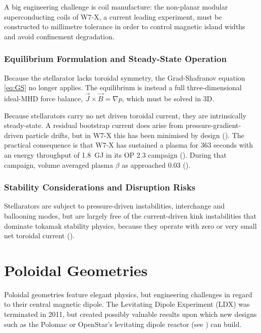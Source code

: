 A big engineering challenge is coil manufacture: the non-planar modular
superconducting coils of W7-X, a current leading experiment, must be constructed to millimetre tolerance in
order to control magnetic island widths and avoid confinement degradation.


\subsubsection{Equilibrium Formulation and Steady-State Operation}

Because the stellarator lacks toroidal symmetry, the Grad-Shafranov equation \eqref{eq:GS} no longer applies.
The equilibrium is instead a full three-dimensional ideal-MHD force balance,
$\vec{J}\times\vec{B}=\nabla p$, which must be solved in 3D.

Because stellarators carry no net driven toroidal current, they are
intrinsically steady-state. A residual bootstrap current does arise from pressure-gradient-driven particle
drifts, but in W7-X this has been minimised by design (\cite{Freidberg2014}).
The practical consequence is that W7-X has sustained a plasma for 363 seconds
with an energy throughput of \SI{1.8}{\giga\joule} in its OP 2.3 campaign (\cite{Grulke2026}).
During that campaign, volume averaged plasma $\beta$ as approached $0.03$ (\cite{Grulke2026}).

\subsubsection{Stability Considerations and Disruption Risks}

Stellarators are subject to pressure-driven instabilities, interchange and
ballooning modes, but are largely free of the current-driven kink instabilities
that dominate tokamak stability physics, because they operate with zero or very
small net toroidal current (\cite{Freidberg2014}).




\section{Poloidal Geometries}

Poloidal geometries feature elegant physics, but engineering challenges in regard
to their central magnetic dipole. The Levitating Dipole Experiment (LDX) 
was terminated in 2011, but created possibly valuable results upon which new designs
such as the Polomac or OpenStar's levitating dipole reactor (see \cite{simpson2026}) can build.



